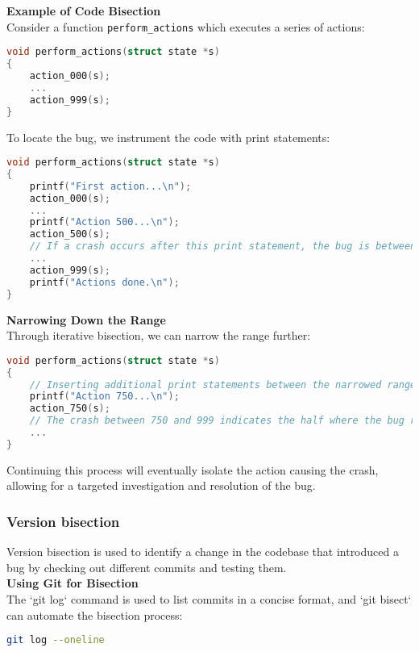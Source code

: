 \documentclass[12pt]{article}
\begin{document}
\textbf{Example of Code Bisection}\\
Consider a function \texttt{perform\_actions} which executes a series of actions:

\begin{lstlisting}[language=C]
void perform_actions(struct state *s)
{
    action_000(s);
    ...
    action_999(s);
}
\end{lstlisting}

To locate the bug, we instrument the code with print statements:

\begin{lstlisting}[language=C]
void perform_actions(struct state *s)
{
    printf("First action...\n");
    action_000(s);
    ...
    printf("Action 500...\n");
    action_500(s);
    // If a crash occurs after this print statement, the bug is between action 500 and 999.
    ...
    action_999(s);
    printf("Actions done.\n");
}
\end{lstlisting}

\textbf{Narrowing Down the Range}\\
Through iterative bisection, we can narrow the range further:

\begin{lstlisting}[language=C]
void perform_actions(struct state *s)
{
    // Inserting additional print statements between the narrowed range
    printf("Action 750...\n");
    action_750(s);
    // The crash between 750 and 999 indicates the half where the bug resides.
    ...
}
\end{lstlisting}

Continuing this process will eventually isolate the action causing the crash, allowing for a targeted investigation and resolution of the bug.



\subsubsection{Version bisection}
Version bisection is used to identify a change in the codebase that introduced a bug by checking out different commits and testing them.\\

\textbf{Using Git for Bisection}\\
The `git log` command is used to list commits in a concise format, and `git bisect` can automate the bisection process:

\begin{lstlisting}[language=bash]
git log --oneline
\end{lstlisting}
\end{document}
